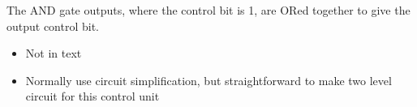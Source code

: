 \iftrue
\begin{frame}[fragile]
The AND gate outputs, where the control bit is 1, are ORed together to give the output control bit.
\BNotes\ifnum{}
\begin{itemize}
  \item Not in text
\item Normally use circuit simplification, but straightforward to make
  two level circuit for this control unit
\end{itemize}
\fi\ENotes
\end{frame}
\fi





% 

